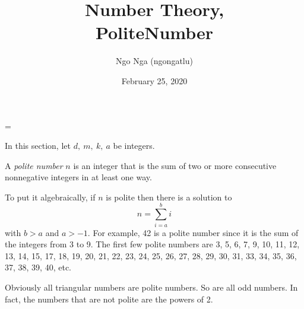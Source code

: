 \documentclass[12pt]{article}
\title{Number Theory,\\ PoliteNumber}
\date{February 25, 2020}
\author{Ngo Nga (ngongatlu)}
\begin{document}
\parskip=\baselineskip

\parindent=0pt

\begin{cnl}


\bigskip



\lsection{}
In this section, let $d,\ m,\ k ,\ a$ be integers.



\begin{demark}
A {\em polite number} $n$ is an integer that is the sum of two or more consecutive nonnegative integers in 
at least one way.

 To put it algebraically, if $n$ is polite then there is a solution to $$n = \sum_{i = a}^b i$$ with 
$b > a$ and $a > -1$. For example, 42 is a polite number since it is the sum of the integers from 3 to 9. 
The first few polite numbers are 3, 5, 6, 7, 9, 10, 11, 12, 13, 14, 15, 17, 18, 19, 20, 21, 22, 23, 24, 
25, 26, 27, 28, 29, 30, 31, 33, 34, 35, 36, 37, 38, 39, 40, etc.

Obviously all triangular numbers are polite numbers. So are all odd numbers. In fact, the numbers that are
 not polite are the powers of 2.
\end{demark}



\end{cnl}
\end{document}
